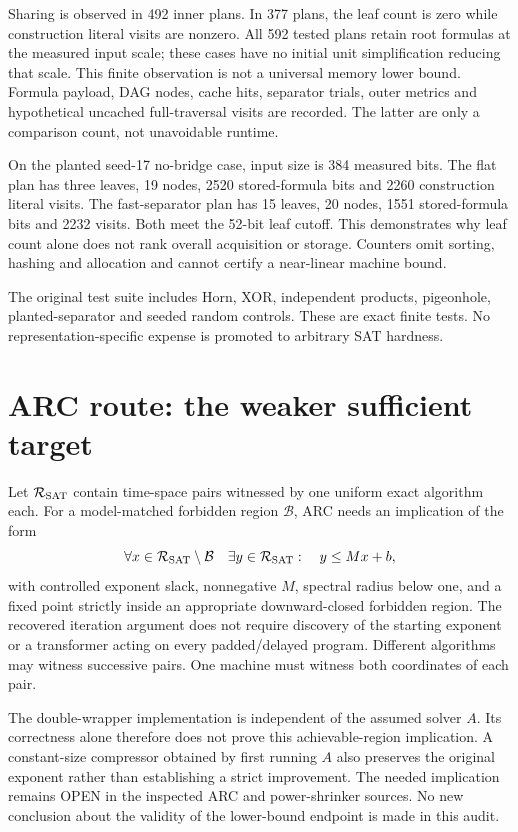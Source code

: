 \documentclass[11pt]{article}
\begin{document}
Sharing is observed in 492 inner plans. In 377 plans, the leaf count is zero
while construction literal visits are nonzero. All 592 tested plans retain
root formulas at the measured input scale; these cases have no initial unit
simplification reducing that scale. This finite observation is not a universal
memory lower bound. Formula payload, DAG nodes, cache hits, separator trials,
outer metrics and hypothetical uncached full-traversal visits are recorded.
The latter are only a comparison count, not unavoidable runtime.

On the planted seed-17 no-bridge case, input size is 384 measured bits.
The flat plan has three leaves, 19 nodes, 2520 stored-formula bits and 2260
construction literal visits. The fast-separator plan has 15 leaves, 20 nodes,
1551 stored-formula bits and 2232 visits. Both meet the 52-bit leaf cutoff.
This demonstrates why leaf count alone does not rank overall acquisition or
storage. Counters omit sorting, hashing and allocation and cannot certify a
near-linear machine bound.

The original test suite includes Horn, XOR, independent products, pigeonhole,
planted-separator and seeded random controls. These are exact finite tests.
No representation-specific expense is promoted to arbitrary SAT hardness.

\section*{ARC route: the weaker sufficient target}
Let $\mathcal R_{\rm SAT}$ contain time-space pairs witnessed by one uniform
exact algorithm each. For a model-matched forbidden region $\mathcal B$, ARC
needs an implication of the form
\[
 \forall x\in\mathcal R_{\rm SAT}\setminus\mathcal B\quad
 \exists y\in\mathcal R_{\rm SAT}:\quad y\le Mx+b,
\]
with controlled exponent slack, nonnegative $M$, spectral radius below one,
and a fixed point strictly inside an appropriate downward-closed forbidden
region. The recovered iteration argument does not require discovery of the
starting exponent or a transformer acting on every padded/delayed program.
Different algorithms may witness successive pairs. One machine must witness
both coordinates of each pair.

The double-wrapper implementation is independent of the assumed solver $A$.
Its correctness alone therefore does not prove this achievable-region
implication. A constant-size compressor obtained by first running $A$ also
preserves the original exponent rather than establishing a strict improvement.
The needed implication remains OPEN in the inspected ARC and power-shrinker
sources. No new conclusion about the validity of the lower-bound endpoint is
made in this audit.
\end{document}
